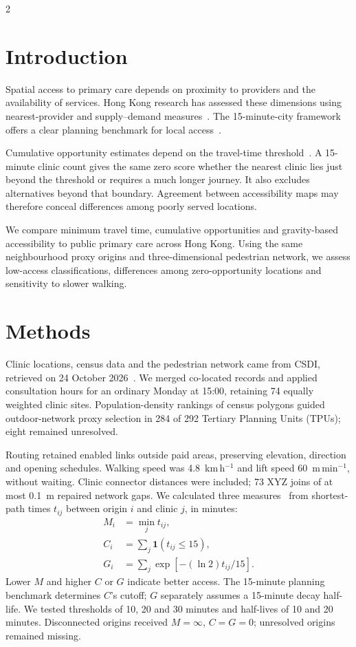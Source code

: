 \documentclass[10pt,a4paper]{article}
\begin{document}
\begin{multicols}{2}
\section*{Introduction}
Spatial access to primary care depends on proximity to providers and the availability of services. Hong Kong research has assessed these dimensions using nearest-provider and supply--demand measures~\cite{xiong2022}. The 15-minute-city framework offers a clear planning benchmark for local access~\cite{moreno2021}.

Cumulative opportunity estimates depend on the travel-time threshold~\cite{tomasiello2023}. A 15-minute clinic count gives the same zero score whether the nearest clinic lies just beyond the threshold or requires a much longer journey. It also excludes alternatives beyond that boundary. Agreement between accessibility maps may therefore conceal differences among poorly served locations.

We compare minimum travel time, cumulative opportunities and gravity-based accessibility to public primary care across Hong Kong. Using the same neighbourhood proxy origins and three-dimensional pedestrian network, we assess low-access classifications, differences among zero-opportunity locations and sensitivity to slower walking.

\section*{Methods}
Clinic locations, census data and the pedestrian network came from CSDI, retrieved on 24 October 2026~\cite{csdiClinics,csdiTPU,csdiCensus,csdiNetwork}. We merged co-located records and applied consultation hours for an ordinary Monday at 15:00, retaining 74 equally weighted clinic sites. Population-density rankings of census polygons guided outdoor-network proxy selection in 284 of 292 Tertiary Planning Units (TPUs); eight remained unresolved.

Routing retained enabled links outside paid areas, preserving elevation, direction and opening schedules. Walking speed was 4.8~km\,h$^{-1}$ and lift speed 60~m\,min$^{-1}$, without waiting. Clinic connector distances were included; 73 XYZ joins of at most 0.1~m repaired network gaps. We calculated three measures~\cite{geurs2004} from shortest-path times $t_{ij}$ between origin $i$ and clinic $j$, in minutes:
\[
\begin{aligned}
M_i&=\min_j t_{ij},\\
C_i&=\sum_j\mathbf{1}(t_{ij}\leq15),\\
G_i&=\sum_j\exp[-(\ln2)t_{ij}/15].
\end{aligned}
\]
Lower $M$ and higher $C$ or $G$ indicate better access. The 15-minute planning benchmark determines $C$'s cutoff; $G$ separately assumes a 15-minute decay half-life. We tested thresholds of 10, 20 and 30 minutes and half-lives of 10 and 20 minutes. Disconnected origins received $M=\infty$, $C=G=0$; unresolved origins remained missing.


\end{multicols}
\end{document}
